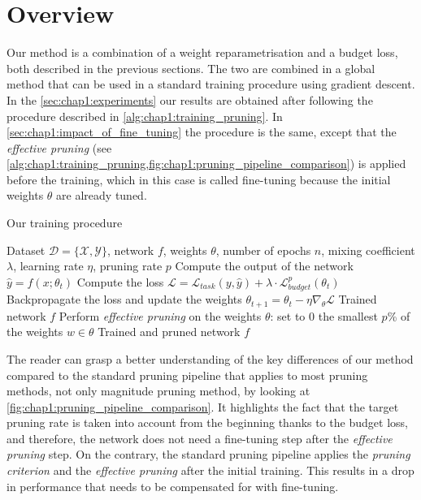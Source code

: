 
\section{Overview}
\label{sec:chap1:overview}
Our method is a combination of a weight reparametrisation and a budget loss,
both described in the previous sections. The two are combined in a global method
that can be used in a standard training procedure using gradient descent. In the
\cref{sec:chap1:experiments} our results are obtained after following the
procedure described in \cref{alg:chap1:training_pruning}. In
\cref{sec:chap1:impact_of_fine_tuning} the procedure is the same, except that
the \emph{effective pruning} (see
\cref{alg:chap1:training_pruning,fig:chap1:pruning_pipeline_comparison}) is
applied before the training, which in this case is called fine-tuning because
the initial weights $\theta$ are already tuned.\\

\begin{algorithm}
  \caption{Our training procedure}
  \label{alg:chap1:training_pruning}
  \begin{algorithmic}
  \REQUIRE Dataset $\mathcal{D} = \{\mathcal{X}, \mathcal{Y}\}$, network $f$,
  weights $\theta$, number of epochs $n$, mixing coefficient $\lambda$, learning
  rate $\eta$, pruning rate $p$
          \STATE Compute the output of the network $\hat{y} = f(x; \theta_t)$
          \STATE Compute the loss $\mathcal{L}= \mathcal{L}_{task}(y, \hat{y}) + \lambda \cdot \mathcal{L}^{p}_{budget}(\theta_t)$
          \STATE Backpropagate the loss and update the weights $\theta_{t+1} = \theta_t - \eta \nabla_{\theta} \mathcal{L}$
      \ENDFOR
  \ENDFOR
  \RETURN Trained network $f$
  \STATE Perform \emph{effective pruning} on the weights $\theta$: set to 0 the
  smallest $p$\% of the weights $w\in\theta$
  \RETURN Trained and pruned network $f$
  \end{algorithmic}
  \end{algorithm}


The reader can grasp a better understanding of the key differences of our method
compared to the standard pruning pipeline that applies to most pruning methods,
not only magnitude pruning method, by looking at
\cref{fig:chap1:pruning_pipeline_comparison}. It highlights the fact that the
target pruning rate is taken into account from the beginning thanks to the
budget loss, and therefore, the network does not need a fine-tuning step after
the \emph{effective pruning} step. On the contrary, the standard pruning
pipeline applies the \emph{pruning criterion} and the \emph{effective pruning}
after the initial training. This results in a drop in performance that needs to
be compensated for with fine-tuning. \\

